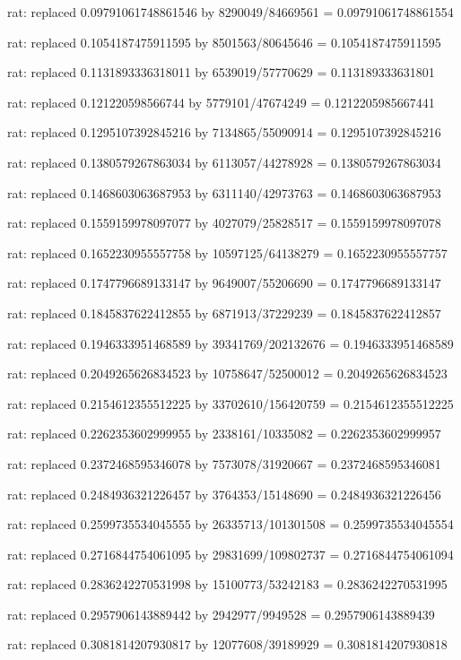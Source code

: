 \documentclass[a4paper,10pt]{article}
\begin{document}
\begin{eulernotebook}
\begin{eulercomment}
\begin{eulercomment}
\begin{eulercomment}
\begin{eulercomment}
\begin{eulercomment}
\begin{eulercomment}
\begin{eulercomment}
\begin{eulercomment}
\begin{eulercomment}
\begin{eulercomment}
\begin{eulercomment}
\begin{eulercomment}
\begin{eulercomment}
\begin{eulercomment}
\begin{eulercomment}
\begin{eulercomment}
\begin{euleroutput}
  rat: replaced 0.09791061748861546 by 8290049/84669561 = 0.09791061748861554
  
  rat: replaced 0.1054187475911595 by 8501563/80645646 = 0.1054187475911595
  
  rat: replaced 0.1131893336318011 by 6539019/57770629 = 0.113189333631801
  
  rat: replaced 0.121220598566744 by 5779101/47674249 = 0.1212205985667441
  
  rat: replaced 0.1295107392845216 by 7134865/55090914 = 0.1295107392845216
  
  rat: replaced 0.1380579267863034 by 6113057/44278928 = 0.1380579267863034
  
  rat: replaced 0.1468603063687953 by 6311140/42973763 = 0.1468603063687953
  
  rat: replaced 0.1559159978097077 by 4027079/25828517 = 0.1559159978097078
  
  rat: replaced 0.1652230955557758 by 10597125/64138279 = 0.1652230955557757
  
  rat: replaced 0.1747796689133147 by 9649007/55206690 = 0.1747796689133147
  
  rat: replaced 0.1845837622412855 by 6871913/37229239 = 0.1845837622412857
  
  rat: replaced 0.1946333951468589 by 39341769/202132676 = 0.1946333951468589
  
  rat: replaced 0.2049265626834523 by 10758647/52500012 = 0.2049265626834523
  
  rat: replaced 0.2154612355512225 by 33702610/156420759 = 0.2154612355512225
  
  rat: replaced 0.2262353602999955 by 2338161/10335082 = 0.2262353602999957
  
  rat: replaced 0.2372468595346078 by 7573078/31920667 = 0.2372468595346081
  
  rat: replaced 0.2484936321226457 by 3764353/15148690 = 0.2484936321226456
  
  rat: replaced 0.2599735534045555 by 26335713/101301508 = 0.2599735534045554
  
  rat: replaced 0.2716844754061095 by 29831699/109802737 = 0.2716844754061094
  
  rat: replaced 0.2836242270531998 by 15100773/53242183 = 0.2836242270531995
  
  rat: replaced 0.2957906143889442 by 2942977/9949528 = 0.2957906143889439
  
  rat: replaced 0.3081814207930817 by 12077608/39189929 = 0.3081814207930818
  

\end{euleroutput}
\end{eulercomment}
\end{eulercomment}
\end{eulercomment}
\end{eulercomment}
\end{eulercomment}
\end{eulercomment}
\end{eulercomment}
\end{eulercomment}
\end{eulercomment}
\end{eulercomment}
\end{eulercomment}
\end{eulercomment}
\end{eulercomment}
\end{eulercomment}
\end{eulercomment}
\end{eulercomment}
\end{eulernotebook}
\end{document}
